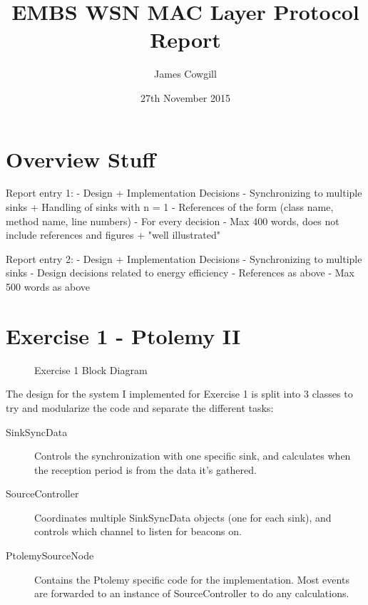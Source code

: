 \documentclass[a4paper,12pt,draft,DIV=calc]{scrartcl}
\begin{document}
\title{EMBS WSN MAC Layer Protocol Report}
\author{James Cowgill}
\date{27th November 2015}
\maketitle

\section{Overview Stuff}
Report entry 1:
 - Design + Implementation Decisions
   - Synchronizing to multiple sinks
   + Handling of sinks with n = 1
 - References of the form (class name, method name, line numbers)
   - For every decision
 - Max 400 words, does not include references and figures
 + "well illustrated"

Report entry 2:
 - Design + Implementation Decisions
   - Synchronizing to multiple sinks
   - Design decisions related to energy efficiency
 - References as above
 - Max 500 words as above

\section{Exercise 1 - Ptolemy II}
\begin{figure}[ht]
  \centering
  \caption{Exercise 1 Block Diagram}
\end{figure}

The design for the system I implemented for Exercise 1 is split into 3 classes to
try and modularize the code and separate the different tasks:
\begin{description}
  \item[SinkSyncData]
    Controls the synchronization with one specific sink, and calculates when
    the reception period is from the data it's gathered.
  \item[SourceController]
    Coordinates multiple SinkSyncData objects (one for each sink), and
    controls which channel to listen for beacons on.
  \item[PtolemySourceNode]
    Contains the Ptolemy specific code for the implementation. Most events are
    forwarded to an instance of SourceController to do any calculations.
\end{description}
\end{document}
